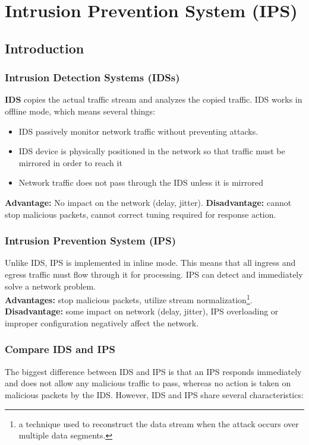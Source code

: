 \chapter{Intrusion Prevention System (IPS)}

\section{Introduction}

\subsection{Intrusion Detection Systems (IDSs)}


\textbf{IDS} copies the actual traffic stream and analyzes the copied traffic. IDS works in offline mode, which means several things:

\begin{itemize}
\item IDS passively monitor network traffic without preventing attacks.
\item IDS device is physically positioned in the network so that traffic must be mirrored in order to reach it
\item Network traffic does not pass through the IDS unless it is mirrored
\end{itemize}

\textbf{Advantage:} No impact on the network (delay, jitter). \textbf{Disadvantage:} cannot stop malicious packets, cannot correct tuning required for response action.

\subsection{Intrusion Prevention System (IPS)}

Unlike IDS, IPS is implemented in inline mode. This means that all ingress and egress traffic must flow through it for processing. IPS can detect and immediately solve a network problem. \\

\textbf{Advantages:} stop malicious packets, utilize stream normalization\footnote{a technique used to reconstruct the data stream when the attack occurs over multiple data segments.}. \textbf{Disadvantage:} some impact on network (delay, jitter), IPS overloading or improper configuration negatively affect the network.\\



\subsection{Compare IDS and IPS}
The biggest difference between IDS and IPS is that an IPS responds immediately and does not allow any malicious traffic to pass, whereas no action is taken on malicious packets by the IDS. However, IDS and IPS share several characteristics:

